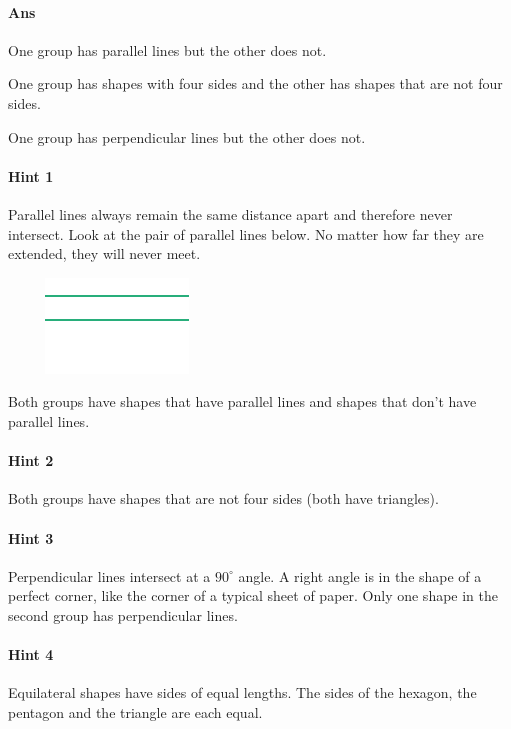 \documentclass[twocolumn,10pt]{article}
\def\shrinkfactor{0.55}
\begin{document}
\paragraph{Ans} 

One group has parallel lines but the other does not.


 One group has shapes with four sides and the other has shapes that are not four sides.

One group has perpendicular lines but the other does not.



\paragraph{Hint 1}Parallel lines always remain the same distance apart and therefore never intersect.  Look at the pair of parallel lines below.  No matter how far they are extended, they will never meet.

$\phantom{xxxx}$
\includegraphics[scale=\shrinkfactor]{figures/7cf1fbfb7516a57d37ad80007a3886c81c33f393.png}  

Both groups have shapes that have parallel lines and shapes that don't have parallel lines.

\paragraph{Hint 2}Both groups have shapes that are not four sides (both have triangles).

\paragraph{Hint 3}Perpendicular lines intersect at a $90 ^\circ$ angle.
A right angle is in the shape of a perfect corner, like the corner of a typical sheet of paper.  Only one shape in the second group has perpendicular lines.

\paragraph{Hint 4}Equilateral shapes have sides of equal lengths.  The sides of the hexagon, the pentagon and the triangle are each equal.
\end{document}
